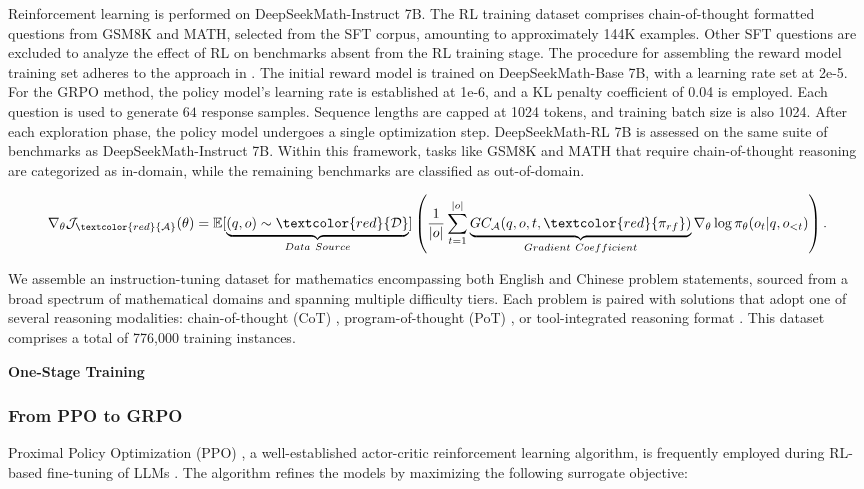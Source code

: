 \begin{itemize}[topsep=0pt]
Reinforcement learning is performed on DeepSeekMath-Instruct 7B. The RL training dataset comprises chain-of-thought formatted questions from GSM8K and MATH, selected from the SFT corpus, amounting to approximately 144K examples. Other SFT questions are excluded to analyze the effect of RL on benchmarks absent from the RL training stage. The procedure for assembling the reward model training set adheres to the approach in \citep{wang2023math}. The initial reward model is trained on DeepSeekMath-Base 7B, with a learning rate set at 2e-5. For the GRPO method, the policy model’s learning rate is established at 1e-6, and a KL penalty coefficient of 0.04 is employed. Each question is used to generate $64$ response samples. Sequence lengths are capped at 1024 tokens, and training batch size is also 1024. After each exploration phase, the policy model undergoes a single optimization step. DeepSeekMath-RL 7B is assessed on the same suite of benchmarks as DeepSeekMath-Instruct 7B. Within this framework, tasks like GSM8K and MATH that require chain-of-thought reasoning are categorized as in-domain, while the remaining benchmarks are classified as out-of-domain.

\begin{equation}
    \nabla_{\theta}\mathcal{J}_{\textcolor{red}{\mathcal{A}}}(\theta) = \mathbb{E}[\underbrace{(q,o) \sim \textcolor{red}{\mathcal{D}}}_{Data \ Source}]\left( \frac{1}{|o|} \sum_{t=1}^{|o|}  \underbrace{GC_{{\mathcal{A}}}(q, o, t, \textcolor{red}{\pi_{{rf}}})}_{Gradient \ Coefficient}  \nabla_{\theta}\log \pi_{\theta}(o_t | q, o_{<t})\right).
\label{eq:objective}
\end{equation}

We assemble an instruction-tuning dataset for mathematics encompassing both English and Chinese problem statements, sourced from a broad spectrum of mathematical domains and spanning multiple difficulty tiers. Each problem is paired with solutions that adopt one of several reasoning modalities: chain-of-thought (CoT) \citep{cot}, program-of-thought (PoT) \citep{pot,pal}, or tool-integrated reasoning format \citep{tora}. This dataset comprises a total of 776,000 training instances.

\textbf{One-Stage Training}

\subsubsection{From PPO to GRPO} Proximal Policy Optimization (PPO) \citep{schulman2017proximal}, a well-established actor-critic reinforcement learning algorithm, is frequently employed during RL-based fine-tuning of LLMs \citep{ouyang2022training}. The algorithm refines the models by maximizing the following surrogate objective:


\end{itemize}
